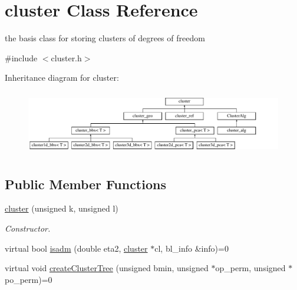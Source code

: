 \hypertarget{classcluster}{
\section{cluster \-Class \-Reference}
\label{classcluster}
}


the basis class for storing clusters of degrees of freedom  




{\ttfamily \#include $<$cluster.\-h$>$}

\-Inheritance diagram for cluster\-:\begin{figure}[H]
\begin{center}
\leavevmode
\includegraphics[height=2.849873cm]{classcluster}
\end{center}
\end{figure}
\subsection*{\-Public \-Member \-Functions}
\begin{DoxyCompactItemize}
\item 
\hyperlink{classcluster_a32fd64e14f672a22f4ee58fe856f1626}{cluster} (unsigned k, unsigned l)
\begin{DoxyCompactList}\small\item\em \-Constructor. \end{DoxyCompactList}\item 
virtual bool \hyperlink{classcluster_aa48a0f4aada61485263d76b82e819b4b}{isadm} (double eta2, \hyperlink{classcluster}{cluster} $\ast$cl, bl\-\_\-info \&info)=0
\item 
virtual void \hyperlink{classcluster_a7eb7a1209c0030e5cf344252f704fd57}{create\-Cluster\-Tree} (unsigned bmin, unsigned $\ast$op\-\_\-perm, unsigned $\ast$po\-\_\-perm)=0
\end{DoxyCompactItemize}
